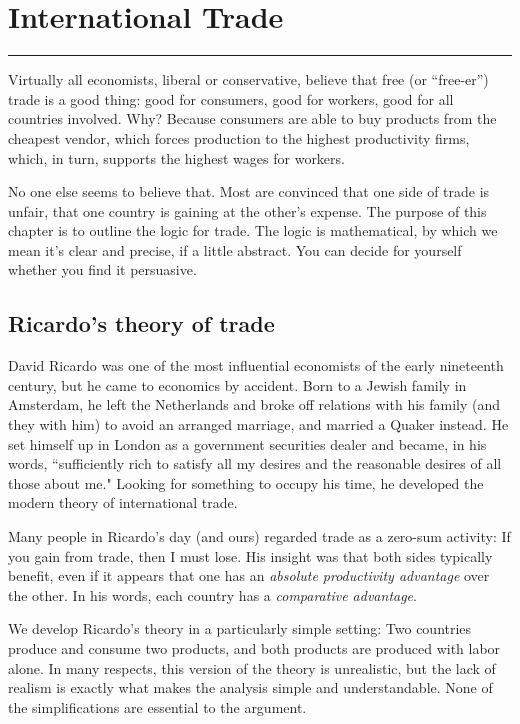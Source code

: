 \chapter{International Trade}\label{chp:intr}
\hypertarget{trade}{}


\rule{\textwidth}{1pt}

Virtually all economists, liberal or conservative, believe that
free (or ``free-er'') trade is a good thing:
good for consumers, good for workers,
good for all countries involved.
Why?  Because consumers are able to buy products
from the cheapest vendor,
which forces production to the highest productivity firms,
which, in turn, supports the highest wages for workers.

No one else seems to believe that.
Most are convinced that one side of trade is unfair, that one country
is gaining at the other's expense.
The purpose of this chapter is to outline the logic for trade.
The logic is mathematical, by which we mean it's clear and precise,
if a little abstract.
You can decide for yourself whether you find it persuasive.


\section{Ricardo's theory of trade}

David Ricardo was one of the most influential economists of the early
nineteenth century,
but he came to economics by accident.  Born to a
Jewish family in Amsterdam, he left the Netherlands and broke off
relations with his family (and they with him) to avoid an arranged
marriage, and married a Quaker instead.  He set himself up in
London as a government securities dealer and became, in his words,
``sufficiently rich to satisfy all my desires and the reasonable
desires of all those about me."  Looking for something to occupy
his time, he developed the modern theory of international trade.

Many people in Ricardo's day (and ours) regarded trade as a
zero-sum activity:  If {you} gain from trade, then I must lose.  His
insight was that both sides typically benefit, even if it appears
that one has an \textit{absolute productivity advantage} over the
other. In his words, each country has a \textit{comparative
advantage}.

We develop Ricardo's theory in a particularly simple setting:
Two countries produce and consume two products, and both products
are produced with labor alone.  In many respects, this version of
the theory is unrealistic, but the lack of realism is exactly what
makes the analysis simple and understandable.
None of the simplifications are essential to the argument.

